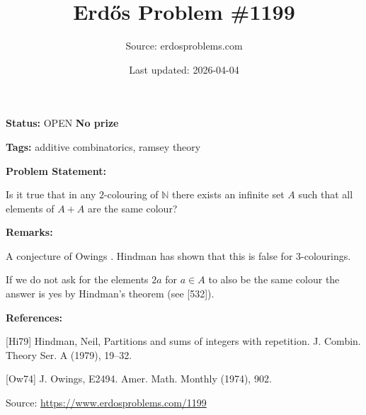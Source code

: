 \documentclass{article}
\title{Erd\H{o}s Problem \#1199}
\date{Last updated: 2026-04-04}
\author{Source: erdosproblems.com}
\begin{document}
\maketitle

\noindent\textbf{Status:} OPEN \quad \textbf{No prize}

\noindent\textbf{Tags:} additive combinatorics, ramsey theory

\medskip
\noindent\textbf{Problem Statement:}

Is it true that in any $2$-colouring of $\mathbb{N}$ there exists an infinite set $A$ such that all elements of $A+A$ are the same colour?

\bigskip
\noindent\textbf{Remarks:}

A conjecture of Owings \cite{Ow74}. Hindman \cite{Hi79} has shown that this is false for $3$-colourings. 

If we do not ask for the elements $2a$ for $a\in A$ to also be the same colour the answer is yes by Hindman's theorem (see [532]).

\bigskip
\noindent\textbf{References:}

[Hi79] Hindman, Neil, Partitions and sums of integers with repetition. J. Combin. Theory Ser. A (1979), 19--32.
 
 [Ow74] J. Owings, E2494. Amer. Math. Monthly (1974), 902.

\bigskip
\noindent\small{Source: \url{https://www.erdosproblems.com/1199}}
\end{document}
